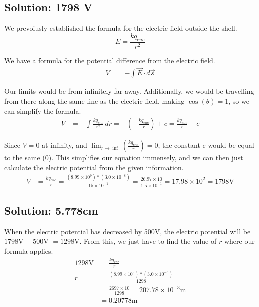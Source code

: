 \documentclass[12pt]{article}
\begin{document}
\subsection{Solution: 1798 V}
We prevoiusly established the formula for the electric field outside the shell.
\begin{equation*}
    E = \frac{kq_{enc}}{r^2}
\end{equation*}

We have a formula for the potential difference from the electric field.
\begin{align*}
    V   &=  -\int \vec{E}\cdot d\vec{s}
\end{align*}

Our limits would be from infinitely far away. 
Additionally, we would be travelling from there along the same line as the electric field, making $\cos(\theta) = 1$, so we can simplify the formula. 
\begin{align*}
    V   &=  -\int \frac{kq_{enc}}{r^2} \,dr
        =   -\left(-\frac{kq_{enc}}{r}\right) + c
        =   \frac{kq_{enc}}{r} + c
\end{align*}

Since $V = 0$ at infinity, and \(\lim_{r \to \inf}\left(\frac{kq_{enc}}{r}\right) = 0\), the constant c would be equal to the same (0).
This simplifies our equation immensely, and we can then just calculate the electric potential from the given information.
\begin{align*}
    V   &=  \frac{kq_{enc}}{r}
        =   \frac{(8.99 \times 10^9)*(3.0 \times 10^{-8})}{15 \times 10^{-1}}
        =   \frac{26.97 \times 10}{1.5 \times 10^{-1}}
        =   17.98 \times 10^2 
        =   \boxed{1798 \unit{\volt}}
\end{align*}

\subsection{Solution: 5.778cm}
When the electric potential has decreased by 500V, the electric potential will be $1798$V $-\ 500$V $= 1298$V. 
From this, we just have to find the value of $r$ where our formula applies.
\begin{align*}
    1298 \unit{\volt}   &=  \frac{kq_{enc}}{r}\\
    r   &=  \frac{(8.99 \times 10^9)*(3.0 \times 10^{-8})}{1298}\\
        &=  \frac{2697 \times 10}{1298}
        =   207.78 \times 10^{-3} \unit{\meter}\\
        &=  0.20778 \unit{\meter}
\end{align*}
\end{document}
